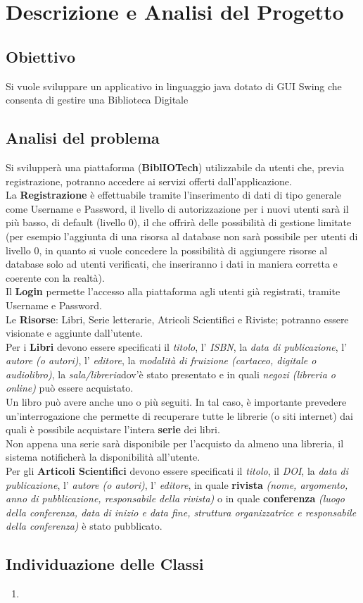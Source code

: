 \chapter{Descrizione e Analisi del Progetto}
\section{Obiettivo}
Si vuole sviluppare un applicativo in linguaggio java dotato di GUI Swing che consenta di gestire una Biblioteca Digitale
\section{Analisi del problema}
Si svilupperà una piattaforma (\textbf{BiblIOTech}) utilizzabile da utenti che, previa registrazione, potranno accedere ai servizi offerti dall'applicazione.
\\ \indent La \textbf{Registrazione} è effettuabile tramite l'inserimento di dati di tipo generale come Username e Password, il livello di autorizzazione per i nuovi utenti sarà il più basso, di default (livello 0), il che offrirà delle possibilità di gestione limitate (per esempio l'aggiunta di una risorsa al database non sarà possibile per utenti di livello 0, in quanto si vuole concedere la possibilità di aggiungere risorse al database solo ad utenti verificati, che inseriranno i dati in maniera corretta e coerente con la realtà).
\\ \indent Il \textbf{Login} permette l'accesso alla piattaforma agli utenti già registrati, tramite Username e Password.
\\ \indent Le \textbf{Risorse}: Libri, Serie letterarie, Atricoli Scientifici e Riviste; potranno essere visionate e aggiunte dall'utente.
\\ \indent Per i \textbf{Libri} devono essere specificati il \emph{titolo}, l' \emph{ISBN}, la \emph{data di publicazione}, l' \emph{autore (o autori)}, l' \emph{editore}, la \emph{modalità di fruizione (cartaceo, digitale o audiolibro)}, la \emph{sala/libreria}dov'è stato presentato e in quali \emph{negozi (libreria o online)} può essere acquistato.\\ Un libro può avere anche uno o più seguiti. In tal caso, è importante prevedere un’interrogazione che permette di recuperare tutte le librerie (o siti internet) dai quali è possibile acquistare l’intera \textbf{serie} dei libri.\\ Non appena una serie sarà disponibile per l’acquisto da almeno una libreria, il sistema notificherà la disponibilità all’utente.
\\ \indent Per gli \textbf{Articoli Scientifici} devono essere specificati il \emph{titolo}, il \emph{DOI}, la \emph{data di publicazione}, l' \emph{autore (o autori)}, l' \emph{editore}, in quale \textbf{rivista} \emph{(nome, argomento, anno di pubblicazione, responsabile della rivista)} o in quale \textbf{conferenza} \emph{(luogo della conferenza, data di inizio e data fine, struttura organizzatrice e responsabile della conferenza)} è stato pubblicato.
\section{Individuazione delle Classi}
\begin{enumerate}
    \item 
\end{enumerate}